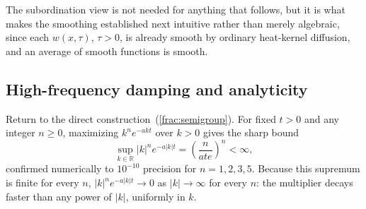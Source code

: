 \documentclass{article}
\begin{document}
The subordination view is not needed for anything that follows, but it is
what makes the smoothing established next intuitive rather than merely
algebraic, since each $w(x,\tau)$, $\tau>0$, is already smooth by ordinary
heat-kernel diffusion, and an average of smooth functions is smooth.

\subsection{High-frequency damping and analyticity}
\label{sec:semigroup-analyticity}

Return to the direct construction~(\ref{frac:semigroup}). For fixed $t>0$
and any integer $n\ge0$, maximizing $k^ne^{-akt}$ over $k>0$ gives the
sharp bound
\begin{equation}
\sup_{k\in\mathbb{R}} |k|^n e^{-a|k|t} = \left(\frac{n}{ate}\right)^n < \infty,
\label{frac:supbound}
\end{equation}
confirmed numerically to $10^{-10}$ precision for $n=1,2,3,5$. Because this
supremum is finite for every $n$, $|k|^ne^{-a|k|t}\to0$ as $|k|\to\infty$
for every $n$: the multiplier decays faster than any power of $|k|$,
uniformly in $k$.
\end{document}

